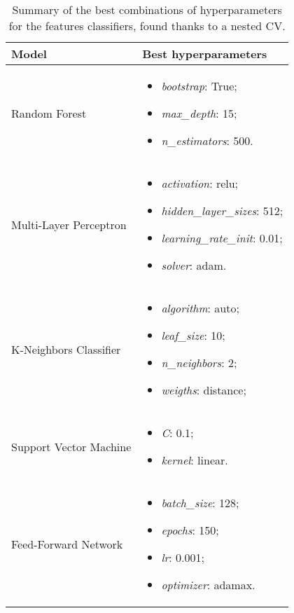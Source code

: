 \begin{table}[!ht]
	\centering
	\begin{tabular}{p{} p{}}
		\toprule
		\textbf{Model} & \textbf{Best hyperparameters} \\
		\midrule
		Random Forest & \begin{itemize} 
			\item \textit{bootstrap}: True;
			\item \textit{max\_depth}: 15;
			\item \textit{n\_estimators}: 500.
		\end{itemize} \\
		\midrule
		Multi-Layer Perceptron & \begin{itemize}
			\item \textit{activation}: relu;
			\item \textit{hidden\_layer\_sizes}: 512;
			\item \textit{learning\_rate\_init}: 0.01;
			\item \textit{solver}: adam.
		\end{itemize} \\
		\midrule
		K-Neighbors Classifier  & \begin{itemize}
			\item \textit{algorithm}: auto;
			\item \textit{leaf\_size}: 10;
			\item \textit{n\_neighbors}: 2;
			\item \textit{weigths}: distance;
		\end{itemize} \\
		\midrule
		Support Vector Machine  & \begin{itemize}
			\item \textit{C}: 0.1;
			\item \textit{kernel}: linear.
		\end{itemize} \\
		\midrule
		Feed-Forward Network & \begin{itemize}
			\item \textit{batch\_size}: 128;
			\item \textit{epochs}: 150;
			\item \textit{lr}: 0.001;
			\item \textit{optimizer}: adamax.
		\end{itemize} \\	
		\bottomrule
	\end{tabular}
	\caption{Summary of the best combinations of hyperparameters for the features classifiers, found thanks to a nested CV.}
	\label{tab:summay_best_params}
\end{table}